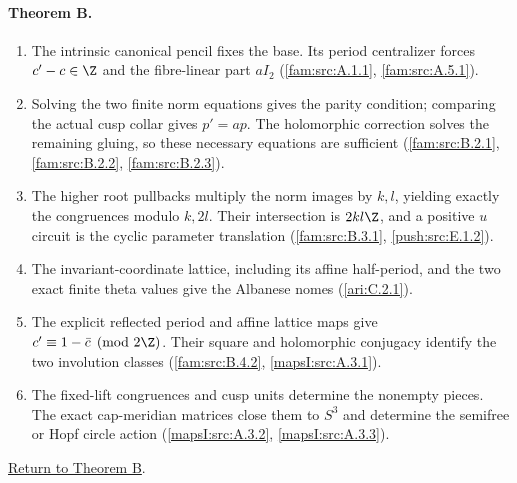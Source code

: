 \hypertarget{outline-I-B}{}
\paragraph{Theorem B.}
\begin{enumerate}[label=\arabic*.]
\item\hypertarget{step-I-B-1}{} The intrinsic canonical pencil
fixes the base.  Its period centralizer forces $c'-c\in\Z$ and
the fibre-linear part $aI_2$
(\hyperref[fam:src:A.1.1]{\ref*{fam:src:A.1.1}},
\hyperref[fam:src:A.5.1]{\ref*{fam:src:A.5.1}}).
\item\hypertarget{step-I-B-2}{} Solving the two finite norm
equations gives the parity condition; comparing the actual cusp
collar gives $p'=ap$.  The holomorphic correction solves the
remaining gluing, so these necessary equations are sufficient
(\hyperref[fam:src:B.2.1]{\ref*{fam:src:B.2.1}},
\hyperref[fam:src:B.2.2]{\ref*{fam:src:B.2.2}},
\hyperref[fam:src:B.2.3]{\ref*{fam:src:B.2.3}}).
\item\hypertarget{step-I-B-3}{} The higher root pullbacks multiply
the norm images by $k,l$, yielding exactly the congruences modulo
$k,2l$.  Their intersection is $2kl\Z$, and a positive $u$
circuit is the cyclic parameter translation
(\hyperref[fam:src:B.3.1]{\ref*{fam:src:B.3.1}},
\hyperref[push:src:E.1.2]{\ref*{push:src:E.1.2}}).
\item\hypertarget{step-I-B-4}{} The invariant-coordinate lattice,
including its affine half-period, and the two exact finite theta
values give the Albanese nomes
(\hyperref[ari:C.2.1]{\ref*{ari:C.2.1}}).
\item\hypertarget{step-I-B-5}{} The explicit reflected period
and affine lattice maps give $c'\equiv1-\bar c\pmod{2\Z}$.
Their square and holomorphic conjugacy identify the two
involution classes
(\hyperref[fam:src:B.4.2]{\ref*{fam:src:B.4.2}},
\hyperref[mapsI:src:A.3.1]{\ref*{mapsI:src:A.3.1}}).
\item\hypertarget{step-I-B-6}{} The fixed-lift congruences and
cusp units determine the nonempty pieces.  The exact cap-meridian
matrices close them to $S^3$ and determine the semifree or Hopf
circle action
(\hyperref[mapsI:src:A.3.2]{\ref*{mapsI:src:A.3.2}},
\hyperref[mapsI:src:A.3.3]{\ref*{mapsI:src:A.3.3}}).
\end{enumerate}
\hyperlink{main-I-B}{Return to Theorem B}.

\hypertarget{outline-I-C}{}
